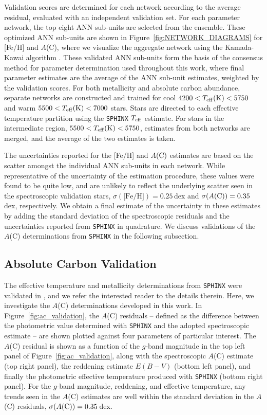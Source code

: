 \documentclass[twocolumn,trackchanges]{aastex63}
\begin{document}
Validation scores are determined for each network according to the average residual, evaluated with an independent validation set. For each parameter network, the top eight ANN sub-units are selected from the ensemble. These optimized ANN sub-units are shown in Figure~\ref{fig:NETWORK_DIAGRAMS} for [Fe/H] and $A$(C), where we visualize the aggregate network using the Kamada-Kawai algorithm \citep{KAMADA1989}. These validated ANN sub-units form the basis of the consensus method for parameter determination used throughout this work, where final parameter estimates are the average of the ANN sub-unit estimates, weighted by the validation scores. For both metallicity and absolute carbon abundance, separate networks are constructed and trained for cool $4200 < T_{\rm eff} {\rm(K)} < 5750$ and warm $5500 < T_{\rm eff} {\rm(K)} < 7000$ stars. Stars are directed to each effective temperature partition using the \texttt{SPHINX} $T_{\rm eff}$ estimate. For stars in the intermediate region, $5500 < T_{\rm eff}{\rm(K)} < 5750$, estimates from both networks are merged, and the average of the two estimates is taken.

The uncertainties reported for the [Fe/H] and $A{\rm(C)}$ estimates are based on the scatter amongst the individual ANN sub-units in each network. While representative of the uncertainty of the estimation procedure, these values were found to be quite low, and are unlikely to reflect the underlying scatter seen in the spectroscopic validation stars, $\sigma(\textrm{[Fe/H]}) = 0.25$\,dex and $\sigma(A{\rm(C)})=0.35$\,dex, respectively. We obtain a final estimate of the uncertainty in these estimates by adding the standard deviation of the spectroscopic residuals and the uncertainties reported from \texttt{SPHINX} in quadrature. We discuss validations of the $A$(C) determinations from \texttt{SPHINX} in the following subsection.

\subsection{Absolute Carbon Validation}\label{section:ac_validation}

The effective temperature and metallicity determinations from \texttt{SPHINX} were validated in \citet{Whitten:2019a}, and we refer the interested reader to the details therein. Here, we investigate the $A$(C) determinations developed in this work. In Figure~\ref{fig:ac_validation}, the $A$(C) residuals -- defined as the difference between the photometric value determined with \texttt{SPHINX} and the adopted spectroscopic estimate -- are shown plotted against four parameters of particular interest. The $A$(C) residual is shown as a function of the $g$-band magnitude in the top left panel of Figure~\ref{fig:ac_validation}, along with the spectroscopic $A$(C) estimate (top right panel), the reddening estimate $E(B-V)$ (bottom left panel), and finally the photometric effective temperature produced with \texttt{SPHINX} (bottom right panel). For the $g$-band magnitude, reddening, and effective temperature, any trends seen in the $A$(C) estimates are well within the standard deviation in the $A$(C) residuals, $\sigma(A({\rm C})) = 0.35$\,dex.
\end{document}
